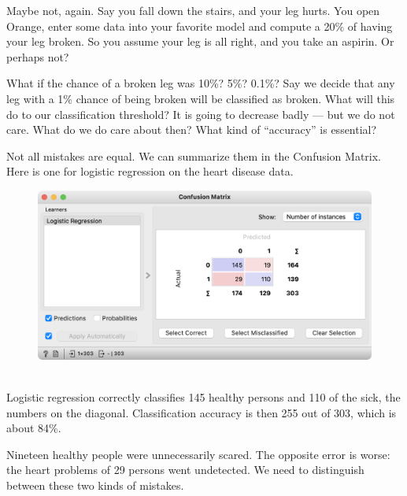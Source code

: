 Maybe not, again. Say you fall down the stairs, and your leg hurts. You open Orange, enter some data into your favorite model and compute a 20\% of having your leg broken. So you assume your leg is all right, and you take an aspirin. Or perhaps not?

What if the chance of a broken leg was 10\%? 5\%? 0.1\%?
Say we decide that any leg with a 1\% chance of being broken will be classified as broken. What will this do to our classification threshold? It is going to decrease badly — but we do not care. What do we do care about then? What kind of “accuracy” is essential?

Not all mistakes are equal.
We can summarize them in the Confusion Matrix. Here is one for logistic regression on the heart disease data.

\begin{figure}[h]
    \centering
    \includegraphics[scale=0.4]{confusion.png}
    \caption{$\;$}
\end{figure}

Logistic regression correctly classifies 145 healthy persons and 110 of the sick, the numbers on the diagonal. Classification accuracy is then 255 out of 303, which is about 84\%.


Nineteen healthy people were unnecessarily scared. The opposite error is worse: the heart problems of 29 persons went undetected. We need to distinguish between these two kinds of mistakes.

